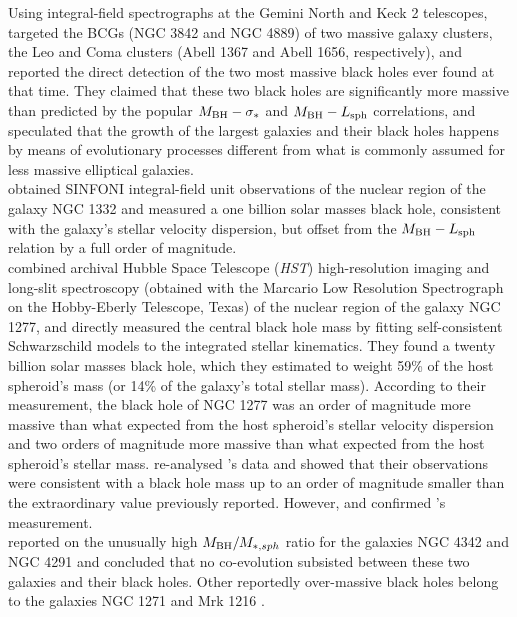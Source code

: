 Using integral-field spectrographs at the Gemini North and Keck 2 telescopes, 
\cite{mcconnell2011} targeted the BCGs (NGC 3842 and NGC 4889) of two massive galaxy clusters, 
the Leo and Coma clusters (Abell 1367 and Abell 1656, respectively), 
and reported the direct detection of the two most massive black holes ever found at that time. 
They claimed that these two black holes are significantly more massive 
than predicted by the popular $M_{\rm BH} - \sigma_*$ and $M_{\rm BH} - L_{\rm sph}$ correlations, 
and speculated that the growth of the largest galaxies and their black holes happens by means of evolutionary processes 
different from what is commonly assumed for less massive elliptical galaxies. \\

\cite{rusli2011} obtained SINFONI integral-field unit observations of the nuclear region of the galaxy NGC 1332 
and measured a one billion solar masses black hole, 
consistent with the galaxy's stellar velocity dispersion, 
but offset from the $M_{\rm BH} - L_{\rm sph}$ relation by a full order of magnitude. \\

\cite{vandenbosch2012} combined archival Hubble Space Telescope (\emph{HST}) high-resolution imaging 
and long-slit spectroscopy (obtained with the Marcario Low Resolution Spectrograph on the Hobby-Eberly Telescope, Texas) 
of the nuclear region of the galaxy NGC 1277, 
and directly measured the central black hole mass by fitting self-consistent Schwarzschild models 
to the integrated stellar kinematics. 
They found a twenty billion solar masses black hole, 
which they estimated to weight 59\% of the host spheroid's mass (or 14\% of the galaxy's total stellar mass). 
According to their measurement, 
the black hole of NGC 1277 was an order of magnitude more massive than what expected from the host spheroid's stellar velocity dispersion 
and two orders of magnitude more massive than what expected from the host spheroid's stellar mass.
\cite{emsellem2013} re-analysed \citeauthor{vandenbosch2012}'s data 
and showed that their observations were consistent with a black hole mass up to an order of magnitude smaller 
than the extraordinary value previously reported. 
However, \cite{yildirim2015} and \cite{scharwachter2015} confirmed \citeauthor{vandenbosch2012}'s measurement. \\

\cite{bogdan2012} reported on the unusually high $M_{\rm BH}/M_{*,sph}$ ratio for the galaxies NGC 4342 and NGC 4291 
and concluded that no co-evolution subsisted between these two galaxies and their black holes. 
Other reportedly over-massive black holes belong to the galaxies NGC 1271 \citep{walsh2015} and Mrk 1216 \citep{yildirim2015}. \\

